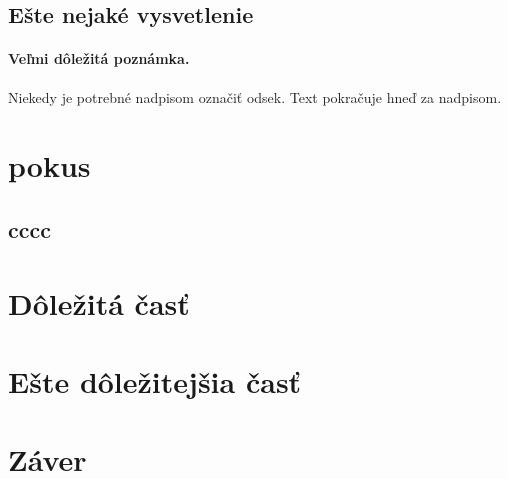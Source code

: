 \documentclass[10pt,twoside,slovak,a4paper]{article}
\begin{document}
\subsection{Ešte nejaké vysvetlenie} \label{ina:este}

\paragraph{Veľmi dôležitá poznámka.}
Niekedy je potrebné nadpisom označiť odsek. Text pokračuje hneď za nadpisom.

\section{pokus}
\subsection{cccc}



\section{Dôležitá časť} \label{dolezita}




\section{Ešte dôležitejšia časť} \label{dolezitejsia}




\section{Záver} \label{zaver} %






\end{document}
